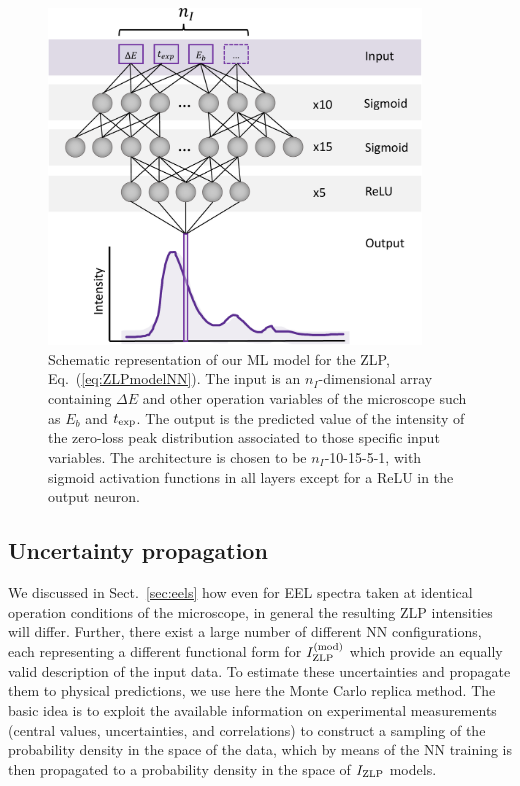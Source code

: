 \begin{figure}[t]
    \centering
    \includegraphics[width=99mm]{plots/architecture.pdf}
    \caption{Schematic representation of our ML model for the ZLP, Eq.~(\ref{eq:ZLPmodelNN}).
      The input is an $n_I$-dimensional array containing $\Delta E$ and other
      operation variables of the microscope such as $E_b$ and $t_{\rm exp}$.
      The output is the predicted value of the intensity of the zero-loss peak
      distribution associated to those specific input variables.
      The architecture is chosen to be $n_I$-10-15-5-1, with sigmoid activation functions
      in all layers except for a ReLU in the output neuron.
    }
    \label{fig:architecture}
\end{figure}

\subsection{Uncertainty propagation}
\label{sec:MCreplicas}

We discussed in Sect.~\ref{sec:eels} how
even for EEL spectra taken at identical operation conditions of the microscope,
in general the resulting ZLP intensities will differ.
%
Further, there exist a large number of different NN configurations, each
representing a different functional form for $I_{\rm ZLP}^{(\rm mod)}$ which provide
an equally valid description of the input data.
%
To  estimate these uncertainties and propagate them to physical predictions,
we use here the Monte Carlo replica method.
%
The basic idea  is to exploit the available information
on experimental measurements (central values, uncertainties, and correlations)
to construct a sampling of the probability density in the space of 
the data, which by means of the NN training is then propagated
to a probability density in the space of $I_{\rm ZLP}$ models.

